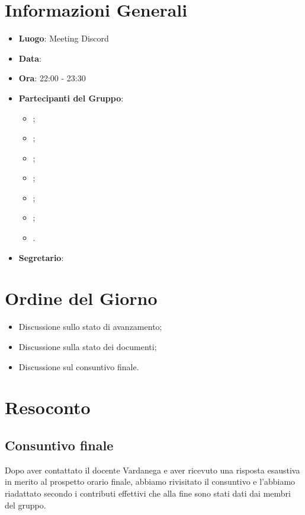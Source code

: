 \section{Informazioni Generali}

\begin{itemize}
	\item{\textbf{Luogo}}: Meeting Discord
	\item{\textbf{Data}}: \D
	\item{\textbf{Ora}}: 22:00 - 23:30
	\item{\textbf{Partecipanti del Gruppo}}:
	\begin{itemize}
		\item{\EP{};}
		\item{\FP{};}
		\item{\GC{};}
		\item{\LW{};}
  		\item {\MB{};}
		\item{\MG{};}
		\item{\PV{}.}
	\end{itemize}
	\item{\textbf{Segretario}}: \PV{}
\end{itemize}

\section{Ordine del Giorno}
\begin{itemize}
	\item{Discussione sullo stato di avanzamento;}
	\item{Discussione sulla stato dei documenti;}
 	\item{Discussione sul consuntivo finale.}
\end{itemize}

\section{Resoconto}
 
\subsection{Consuntivo finale}
Dopo aver contattato il docente Vardanega e aver ricevuto una risposta esaustiva in merito al prospetto orario finale, abbiamo rivisitato il consuntivo e l'abbiamo riadattato secondo i contributi effettivi che alla fine sono stati dati dai membri del gruppo.



